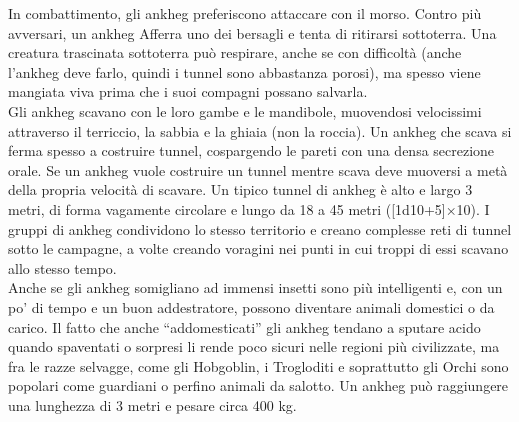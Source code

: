 \begin{multicols}{2}
In combattimento, gli ankheg preferiscono attaccare con il morso. Contro più avversari, un ankheg Afferra uno dei bersagli e tenta di ritirarsi sottoterra. Una creatura trascinata sottoterra può respirare, anche se con difficoltà (anche l’ankheg deve farlo, quindi i tunnel sono abbastanza porosi), ma spesso viene mangiata viva prima che i suoi compagni possano salvarla.\\
Gli ankheg scavano con le loro gambe e le mandibole, muovendosi velocissimi attraverso il terriccio, la sabbia e la ghiaia (non la roccia). Un ankheg che scava si ferma spesso a costruire tunnel, cospargendo le pareti con una densa secrezione orale. Se un ankheg vuole costruire un tunnel mentre scava deve muoversi a metà della propria velocità di scavare. Un tipico tunnel di ankheg è alto e largo 3 metri, di forma vagamente circolare e lungo da 18 a 45 metri ([1d10+5]×10). I gruppi di ankheg condividono lo stesso territorio e creano complesse reti di tunnel sotto le campagne, a volte creando voragini nei punti in cui troppi di essi scavano allo stesso tempo.\\
Anche se gli ankheg somigliano ad immensi insetti sono più intelligenti e, con un po’ di tempo e un buon addestratore, possono diventare animali domestici o da carico. Il fatto che anche “addomesticati” gli ankheg tendano a sputare acido quando spaventati o sorpresi li rende poco sicuri nelle regioni più civilizzate, ma fra le razze selvagge, come gli Hobgoblin, i Trogloditi e soprattutto gli Orchi sono popolari come guardiani o perfino animali da salotto. Un ankheg può raggiungere una lunghezza di 3 metri e pesare circa 400 kg.\\


\end{multicols}
